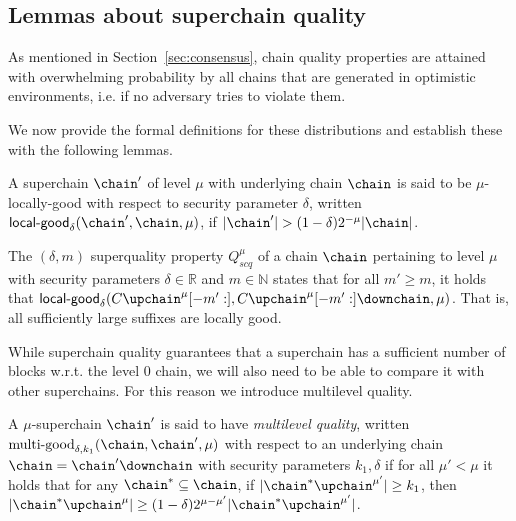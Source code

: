 \subsection{Lemmas about superchain quality}
\label{sec:consensus-full}

As mentioned in Section~\ref{sec:consensus}, chain quality properties are attained
with overwhelming probability by all chains that are generated in optimistic
environments, i.e. if no adversary tries to violate them.

We now provide the formal definitions for these distributions and establish
these with the following lemmas.

\begin{definition}
A superchain $\chain'$ of level
$\mu$ with underlying chain $\chain$ is said to be $\mu$-\textnormal{locally-good}
with respect to security parameter $\delta$, written
$\textsf{local-good}_{\delta}(\chain', \chain, \mu)$, if $|\chain'| > (1 -
\delta)2^{-\mu}|\chain|$.
\end{definition}

\begin{definition}
The $(\delta, m)$ superquality property $Q^\mu_{scq}$ of a chain $\chain$
pertaining to level $\mu$ with security parameters $\delta \in \mathbb{R}$ and
$m \in \mathbb{N}$ states that for all $m' \geq m$, it holds that
$\textsf{local-good}_{\delta}(C\upchain^\mu[-m':],
C\upchain^\mu[-m':]\downchain, \mu)$. That is, all sufficiently large suffixes
are locally good.
\end{definition}

While superchain quality guarantees that a superchain has a sufficient number
of blocks w.r.t. the level 0 chain, we will also need to be able to compare
it with other superchains. For this reason we introduce multilevel quality.

\begin{definition}
A $\mu$-superchain $\chain'$ is said to have \textit{multilevel quality}, written
$\textnormal{multi-good}_{\delta, k_1}(\chain, \chain', \mu)$ with respect to an
underlying chain $\chain = \chain'\downchain$ with security parameters $k_1,
\delta$ if for all $\mu' < \mu$ it holds that for any $\chain^* \subseteq \chain$,
if $|\chain^*\upchain^{\mu'}| \geq k_1$, then $|\chain^*\upchain^{\mu}| \geq (1 -
\delta)2^{\mu - \mu'}|\chain^*\upchain^{\mu'}|$.
\end{definition}


